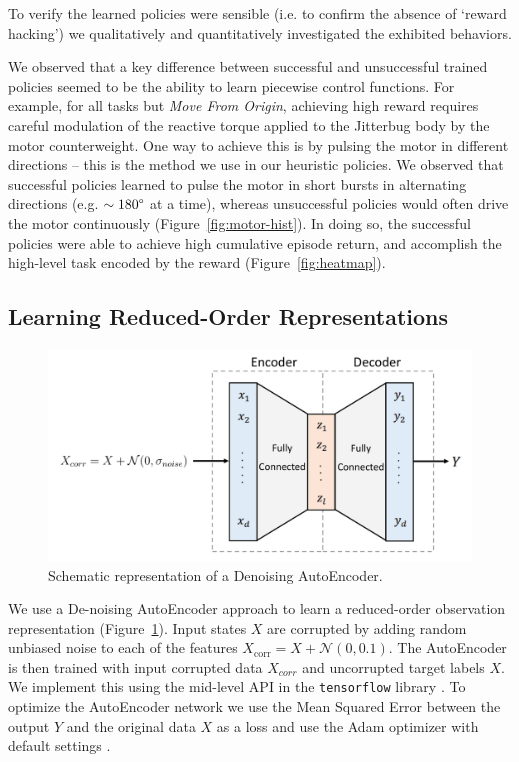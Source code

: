\documentclass[letterpaper, 10 pt, conference]{ieeeconf}
\begin{document}
To verify the learned policies were sensible (i.e. to confirm the absence of `reward hacking') we qualitatively and quantitatively investigated the exhibited behaviors.

We observed that a key difference between successful and unsuccessful trained policies seemed to be the ability to learn piecewise control functions.
For example, for all tasks but \emph{Move From Origin}, achieving high reward requires careful modulation of the reactive torque applied to the Jitterbug body by the motor counterweight.
One way to achieve this is by pulsing the motor in different directions -- this is the method we use in our heuristic policies.
We observed that successful policies learned to pulse the motor in short bursts in alternating directions (e.g. $\sim180\degree$ at a time), whereas unsuccessful policies would often drive the motor continuously (Figure~\ref{fig:motor-hist}).
In doing so, the successful policies were able to achieve high cumulative episode return, and accomplish the high-level task encoded by the reward (Figure~\ref{fig:heatmap}).

\subsection{Learning Reduced-Order Representations}

\begin{figure}[t]
    \centering
    \includegraphics[width=\linewidth]{fig-autoencoder}
    \caption{
        Schematic representation of a Denoising AutoEncoder.
    }
    \label{fig:autoencoder}
\end{figure}

We use a De-noising AutoEncoder approach to learn a reduced-order observation representation (Figure~\ref{fig:autoencoder}).
Input states $X$ are corrupted by adding random unbiased noise to each of the features $X_\text{corr} = X + \mathcal{N}(0, 0.1)$.
The AutoEncoder is then trained with input corrupted data $X_{corr}$ and uncorrupted target labels $X$.
We implement this using the mid-level API in the \texttt{tensorflow} library \cite{Abadi2015Tensorflow}.
To optimize the AutoEncoder network we use the Mean Squared Error between the output $Y$ and the original data $X$ as a loss and use the Adam optimizer with default settings \cite{Adam}.
\end{document}
